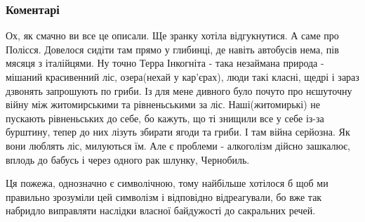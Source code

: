  
 
 
 
 
\subsubsection{Коментарі}
\label{sec:06_09_2021.fb.semesjuk_ivan.1.kiev_pozhar_kostel_arhitektura.cmt}

\begin{itemize} %
 

\obeycr
Ох, як смачно ви все це описали.
Ще зранку хотіла відгукнутися.
А саме про Полісся.
Довелося сидіти там прямо у глибинці, де навіть автобусів нема, пів мясяця з італійцями.
Ну точно Терра Інкогніта - така незаймана природа - мішаний красивенний ліс, озера(нехай у кар'єрах), люди такі класні, щедрі і зараз дзвонять запрошують по гриби.
Із для мене дивного було почуто про нєшуточну війну між житомирськими та рівненьськими за ліс.
Наші(житомирькі) не пускають рівненьських до себе, бо кажуть, що ті знищили все у себе із-за бурштину, тепер до них лізуть збирати ягоди та гриби. І там війна серйозна.
Як вони люблять ліс, милуються їм.
Але є проблеми - алкоголізм дійсно зашкалює, вплодь до бабусь і через одного рак шлунку, Чернобиль.
\restorecr

 

Ця пожежа, однозначно є символічною, тому найбільше хотілося б щоб ми правильно
зрозуміли цей символізм і відповідно відреагували, бо вже так набридло
виправляти наслідки власної байдужості до сакральних речей.


 


\end{itemize}
